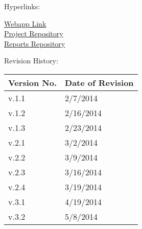 {

Hyperlinks:\\
\begin{center}
\href{http://192.241.248.91}{Webapp Link}\\
\href{https://github.com/dkarivalis/SEP_SMIFL}{Project Repository}\\
\href{https://github.com/dkarivalis/SEP_SMIFL_reports}{Reports Repository}\\
\end{center}

Revision History:
\begin{longtable}{|p{1.6in}|p{2.6in}|}
\hline
{\large\color{color1}Version No.}&{\large \color{color1}Date of Revision}\\\hline
v.1.1&2/7/2014  \\ \hline
v.1.2&2/16/2014 \\ \hline
v.1.3&2/23/2014 \\ \hline
v.2.1&3/2/2014  \\ \hline
v.2.2&3/9/2014  \\ \hline
v.2.3&3/16/2014  \\ \hline
v.2.4&3/19/2014  \\ \hline
v.3.1&4/19/2014  \\ \hline
v.3.2&5/8/2014  \\ \hline
\end{longtable}

\vspace{20mm}\

}

